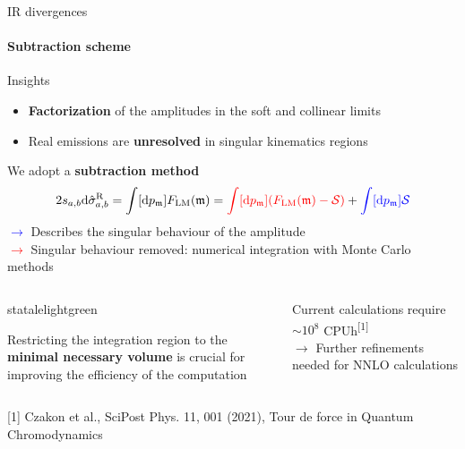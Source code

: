 
\begin{frame} {IR divergences}
 \framesubtitle{Subtraction scheme}
Insights \\
\begin{itemize}
    \item \textbf{Factorization} of the amplitudes in the soft and collinear limits 
    \item Real emissions are \textbf{unresolved} in singular kinematics regions
\end{itemize}
 \vspace{0.5em}
 We adopt a \textbf{subtraction method}
\begin{equation*}
    2s_{a,b} \mathrm{d} \hat{\sigma}_{a,b}^{\mathrm{R}} = \int [\mathrm{d}p_{\mathfrak{m}}] F_{\mathrm{LM}} (\mathfrak{m})=  \textcolor{red}{\int [\mathrm{d}p_{\mathfrak{m}}] (F_{\mathrm{LM}}(\mathfrak{m}) - \mathcal{S})}  + \textcolor{blue}{\int [\mathrm{d}p_{\mathfrak{m}}] \mathcal{S}}
    \label{subtraction-flm}
\end{equation*}
\textcolor{blue}{$\to$} Describes the singular behaviour of the amplitude\\ 
\textcolor{red}{$\to$} Singular behaviour removed: numerical integration with Monte Carlo methods \\

\pause

  \begin{columns}

    \begin{column}{0.50\textwidth}
 \begin{colorblock}[black]{statalelightgreen}{}
\begin{center}
    Restricting the integration region to the \\\textbf{minimal necessary volume} is crucial for improving the efficiency of the computation
\end{center}
\end{colorblock}
    \end{column}

    \begin{column}{0.50\textwidth}
    \begin{center}
        Current calculations require $\sim 10^8$ CPUh\textsuperscript{[1]} \\
        $\to$ Further refinements needed for NNLO calculations 
    \end{center}
    \end{column}
    \end{columns}

\vspace{0.3em}
    {\tiny
[1] Czakon et al., SciPost Phys. 11, 001 (2021), Tour de force in Quantum Chromodynamics
}





\end{frame}

